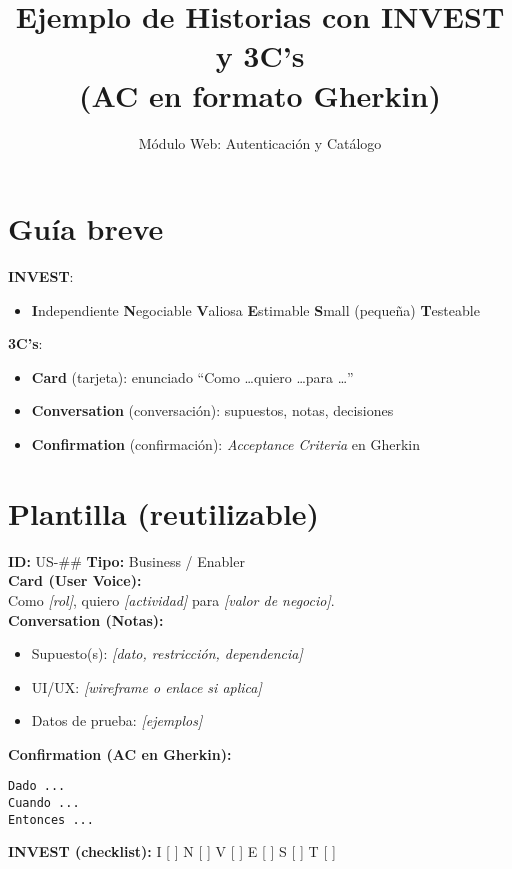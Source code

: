 \documentclass[11pt]{article}
\title{Ejemplo de Historias con INVEST y 3C's \\ (AC en formato Gherkin)}
\author{Módulo Web: Autenticación y Catálogo}
\date{}
\begin{document}
\maketitle

\section*{Guía breve}
\textbf{INVEST}:
\begin{itemize}[nosep]
  \item \textbf{I}ndependiente \quad \textbf{N}egociable \quad \textbf{V}aliosa \quad \textbf{E}stimable \quad \textbf{S}mall (pequeña) \quad \textbf{T}esteable
\end{itemize}

\textbf{3C's}:
\begin{itemize}[nosep]
  \item \textbf{Card} (tarjeta): enunciado ``Como \dots quiero \dots para \dots''
  \item \textbf{Conversation} (conversación): supuestos, notas, decisiones
  \item \textbf{Confirmation} (confirmación): \textit{Acceptance Criteria} en Gherkin
\end{itemize}

\section*{Plantilla (reutilizable)}
\begin{tcolorbox}
\textbf{ID:} US-\#\#  \hfill \textbf{Tipo:} Business / Enabler \\
\textbf{Card (User Voice):} \\
Como \emph{[rol]}, quiero \emph{[actividad]} para \emph{[valor de negocio]}.\\[3pt]
\textbf{Conversation (Notas):}
\begin{itemize}[leftmargin=1.2em]
  \item Supuesto(s): \emph{[dato, restricción, dependencia]}
  \item UI/UX: \emph{[wireframe o enlace si aplica]}
  \item Datos de prueba: \emph{[ejemplos]}
\end{itemize}
\textbf{Confirmation (AC en Gherkin):}
\begin{verbatim}
Dado ...
Cuando ...
Entonces ...
\end{verbatim}
\textbf{INVEST (checklist):} I [ ]  N [ ]  V [ ]  E [ ]  S [ ]  T [ ]
\end{tcolorbox}
\end{document}
